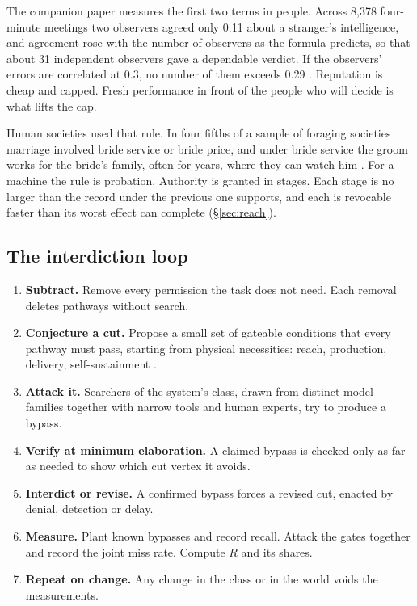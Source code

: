 \documentclass[10pt,twocolumn,letterpaper]{article}
\theoremstyle{definition}
\begin{document}
The companion paper measures the first two terms in people. Across 8{,}378 four-minute meetings two observers agreed only 0.11 about a stranger's intelligence, and agreement rose with the number of observers as the formula predicts, so that about 31 independent observers gave a dependable verdict. If the observers' errors are correlated at 0.3, no number of them exceeds 0.29 \cite{taylor}. Reputation is cheap and capped. Fresh performance in front of the people who will decide is what lifts the cap.

Human societies used that rule. In four fifths of a sample of foraging societies marriage involved bride service or bride price, and under bride service the groom works for the bride's family, often for years, where they can watch him \cite{walker}. For a machine the rule is probation. Authority is granted in stages. Each stage is no larger than the record under the previous one supports, and each is revocable faster than its worst effect can complete (\S\ref{sec:reach}).

\subsection{The interdiction loop}

\begin{enumerate}[label=\arabic*.,leftmargin=1.5em,itemsep=1pt]
\item \textbf{Subtract.} Remove every permission the task does not need. Each removal deletes pathways without search.
\item \textbf{Conjecture a cut.} Propose a small set of gateable conditions that every pathway must pass, starting from physical necessities: reach, production, delivery, self-sustainment \cite{rand}.
\item \textbf{Attack it.} Searchers of the system's class, drawn from distinct model families together with narrow tools and human experts, try to produce a bypass.
\item \textbf{Verify at minimum elaboration.} A claimed bypass is checked only as far as needed to show which cut vertex it avoids.
\item \textbf{Interdict or revise.} A confirmed bypass forces a revised cut, enacted by denial, detection or delay.
\item \textbf{Measure.} Plant known bypasses and record recall. Attack the gates together and record the joint miss rate. Compute $R$ and its shares.
\item \textbf{Repeat on change.} Any change in the class or in the world voids the measurements.
\end{enumerate}
\end{document}
